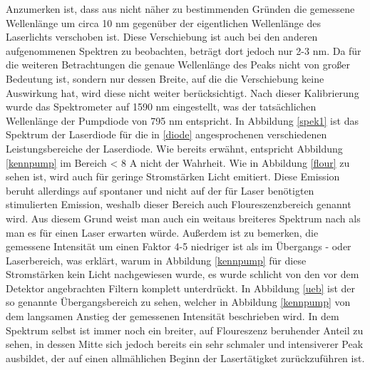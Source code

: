 Anzumerken ist, dass aus nicht näher zu bestimmenden Gründen die gemessene Wellenlänge um circa 10 nm gegenüber der eigentlichen Wellenlänge des Laserlichts verschoben ist. Diese Verschiebung ist auch bei den anderen aufgenommenen Spektren zu beobachten, beträgt dort jedoch nur 2-3 nm. Da für die weiteren Betrachtungen die genaue Wellenlänge des Peaks nicht von großer Bedeutung ist, sondern nur dessen Breite, auf die die Verschiebung keine Auswirkung hat, wird diese nicht weiter berücksichtigt.\newline
Nach dieser Kalibrierung wurde das Spektrometer auf 1590 nm eingestellt, was der tatsächlichen Wellenlänge der Pumpdiode von 795 nm entspricht. \newline
In Abbildung \ref{spek1} ist das Spektrum der Laserdiode für die in \ref{diode} angesprochenen verschiedenen Leistungsbereiche der Laserdiode. Wie bereits erwähnt, entspricht Abbildung \ref{kennpump} im Bereich \newline < 8 A nicht der Wahrheit. Wie in Abbildung \ref{flour} zu sehen ist, wird auch für geringe Stromstärken Licht emitiert. Diese Emission beruht allerdings auf spontaner und nicht auf der für Laser benötigten stimulierten Emission, weshalb dieser Bereich auch Floureszenzbereich genannt wird. Aus diesem Grund weist man auch ein weitaus breiteres Spektrum nach als man es für einen Laser erwarten würde. Außerdem ist zu bemerken, die gemessene Intensität um einen Faktor 4-5 niedriger ist als im Übergangs - oder Laserbereich, was erklärt, warum in Abbildung \ref{kennpump} für diese Stromstärken kein Licht nachgewiesen wurde, es wurde schlicht von den vor dem Detektor angebrachten Filtern komplett unterdrückt. \newline 
In Abbildung \ref{ueb} ist der so genannte Übergangsbereich zu sehen, welcher in Abbildung \ref{kennpump} von dem langsamen Anstieg der gemessenen Intensität beschrieben wird. In dem Spektrum selbst ist immer noch ein breiter, auf Floureszenz beruhender Anteil zu sehen, in dessen Mitte sich jedoch bereits ein sehr schmaler und intensiverer Peak ausbildet, der auf einen allmählichen Beginn der Lasertätigket zurückzuführen ist.
